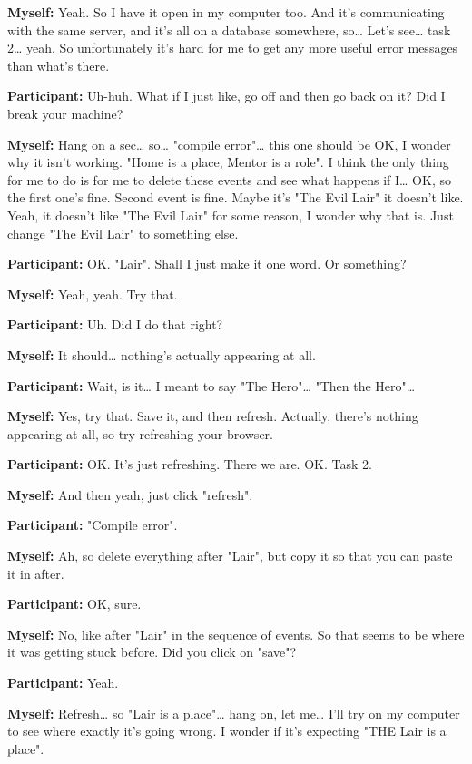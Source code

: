 \documentclass[11pt]{report}
\begin{document}
\begin{linenumbers}
\textbf{Myself:} Yeah. So I have it open in my computer too. And it's communicating with the same server, and it's all on a database somewhere, so\ldots{} Let's see\ldots{} task 2\ldots{} yeah. So unfortunately it's hard for me to get any more useful error messages than what's there.

\textbf{Participant:} Uh-huh. What if I just like, go off and then go back on it? Did I break your machine?

\textbf{Myself:} Hang on a sec\ldots{} so\ldots{} "compile error"\ldots{} this one should be OK, I wonder why it isn't working. "Home is a place, Mentor is a role". I think the only thing for me to do is for me to delete these events and see what happens if I\ldots{} OK, so the first one's fine. Second event is fine. Maybe it's "The Evil Lair" it doesn't like. Yeah, it doesn't like "The Evil Lair" for some reason, I wonder why that is. Just change "The Evil Lair" to something else.

\textbf{Participant:} OK. "Lair". Shall I just make it one word. Or something?

\textbf{Myself:} Yeah, yeah. Try that.

\textbf{Participant:} Uh. Did I do that right?

\textbf{Myself:} It should\ldots{} nothing's actually appearing at all.

\textbf{Participant:} Wait, is it\ldots{} I meant to say "The Hero"\ldots{} "Then the Hero"\ldots{}

\textbf{Myself:} Yes, try that. Save it, and then refresh. Actually, there's nothing appearing at all, so try refreshing your browser.

\textbf{Participant:} OK. It's just refreshing. There we are. OK. Task 2.

\textbf{Myself:} And then yeah, just click "refresh".

\textbf{Participant:} "Compile error".

\textbf{Myself:} Ah, so delete everything after "Lair", but copy it so that you can paste it in after.

\textbf{Participant:} OK, sure.

\textbf{Myself:} No, like after "Lair" in the sequence of events. So that seems to be where it was getting stuck before. Did you click on "save"?

\textbf{Participant:} Yeah.

\textbf{Myself:} Refresh\ldots{} so "Lair is a place"\ldots{} hang on, let
me\ldots{} I'll try on my computer to see where exactly it's going wrong. I
wonder if it's expecting "THE Lair is a place".


\end{linenumbers}
\end{document}
